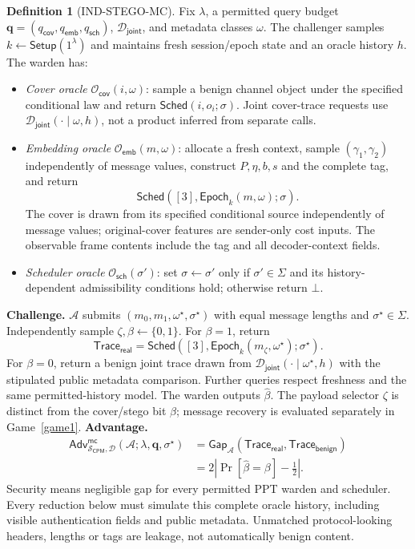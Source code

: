 \documentclass[pdflatex,sn-mathphys-num]{sn-jnl}%
\theoremstyle{definition}
\newtheorem{definition}{Definition}[section]
\theoremstyle{game}
\theoremstyle{thmstyleone}%
\theoremstyle{thmstyletwo}%
\theoremstyle{thmstylethree}%
\begin{document}
\begin{definition}[IND-STEGO-MC]\label{def:ind-stego-mc}
Fix $\lambda$, a permitted query budget
$\mathbf q=(q_{\mathsf{cov}},q_{\mathsf{emb}},q_{\mathsf{sch}})$,
$\mathcal D_{\mathsf{joint}}$, and metadata classes $\omega$.
The challenger samples $k\leftarrow\mathsf{Setup}(1^\lambda)$ and maintains
fresh session/epoch state and an oracle history $h$. The warden has:
\begin{itemize}[leftmargin=1.7em]
\item \emph{Cover oracle} $\mathcal O_{\mathsf{cov}}(i,\omega)$:
sample a benign channel object under the specified conditional law and
return $\mathsf{Sched}(i,o_i;\sigma)$. Joint cover-trace requests use
$\mathcal D_{\mathsf{joint}}(\cdot\mid\omega,h)$, not a product inferred
from separate calls.
\item \emph{Embedding oracle} $\mathcal O_{\mathsf{emb}}(m,\omega)$:
allocate a fresh context, sample $(\gamma_1,\gamma_2)$ independently of
message values, construct $P,\eta,b,s$ and the complete tag, and return
\[
\mathsf{Sched}([3],\mathsf{Epoch}_k(m,\omega);\sigma).
\]
The cover is drawn from its specified conditional source independently
of message values; original-cover features are sender-only cost inputs. The observable frame
contents include the tag and all decoder-context fields.
\item \emph{Scheduler oracle} $\mathcal O_{\mathsf{sch}}(\sigma')$:
set $\sigma\leftarrow\sigma'$ only if $\sigma'\in\Sigma$ and its
history-dependent admissibility conditions hold; otherwise return $\bot$.
\end{itemize}
\noindent\textbf{Challenge.}
$\mathcal A$ submits $(m_0,m_1,\omega^\star,\sigma^\star)$ with equal
message lengths and $\sigma^\star\in\Sigma$. Independently sample
$\zeta,\beta\leftarrow\{0,1\}$. For $\beta=1$, return
\[
\mathsf{Trace}_{\mathsf{real}}
=\mathsf{Sched}([3],\mathsf{Epoch}_k(m_\zeta,\omega^\star);\sigma^\star).
\]
For $\beta=0$, return a benign joint trace drawn from
$\mathcal D_{\mathsf{joint}}(\cdot\mid\omega^\star,h)$ with the stipulated
public metadata comparison. Further queries respect freshness and the same
permitted-history model. The warden outputs $\widehat\beta$.
The payload selector $\zeta$ is distinct from the cover/stego bit $\beta$;
message recovery is evaluated separately in Game~\ref{game1}.
\noindent\textbf{Advantage.}
\[
\begin{aligned}
\mathsf{Adv}^{\mathsf{mc}}_{\mathcal S_{\mathsf{CPM}},\mathbf{\mathcal D}}
 (\mathcal A;\lambda,\mathbf q,\sigma^\star)
&=\mathsf{Gap}_{\mathcal A}(\mathsf{Trace}_{\mathsf{real}},\mathsf{Trace}_{\mathsf{benign}})\\
&=2\left|\Pr[\widehat\beta=\beta]-\tfrac12\right|.
\end{aligned}
\]
Security means negligible gap for every permitted PPT warden and scheduler.
Every reduction below must simulate this complete oracle history, including
visible authentication fields and public metadata. Unmatched protocol-looking
headers, lengths or tags are leakage, not automatically benign content.
\end{definition}
\end{document}

